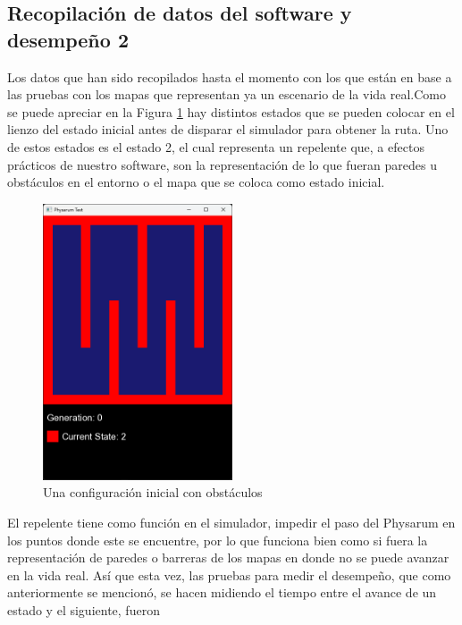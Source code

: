 \subsection{Recopilaci\'on de datos del software y desempe\~no 2}
    Los datos que han sido recopilados hasta el momento con los
        que est\'an en base a las pruebas con los mapas que
        representan ya un escenario de la vida real.Como se puede apreciar en la Figura \ref{fig:Ruta 59}
        hay distintos estados que se pueden colocar en el lienzo del
        estado inicial antes de disparar el simulador para obtener la
        ruta. Uno de estos estados es el estado 2, el cual representa
        un repelente que, a efectos pr\'acticos de nuestro software, son
        la representaci\'on de lo que fueran paredes u obst\'aculos en el
        entorno o el mapa que se coloca como estado inicial.
    \vskip 0.5cm
    \begin{figure}[htbp]
        \centering
        \includegraphics[width=0.5\textwidth]{./images/Pruebas/simulador/image059.png}
        \caption{Una configuraci\'on inicial con obst\'aculos}
        \label{fig:Ruta 59}
    \end{figure}
    \vskip 0.5cm
    El repelente tiene como funci\'on en el simulador, impedir el
        paso del Physarum en los puntos donde este se encuentre,
        por lo que funciona bien como si fuera la representaci\'on de
        paredes o barreras de los mapas en donde no se puede
        avanzar en la vida real.
        \vskip 0.5cm
    As\'i que esta vez, las pruebas para medir el desempe\~no, que
        como anteriormente se mencion\'o, se hacen midiendo el
        tiempo entre el avance de un estado y el siguiente, fueron
